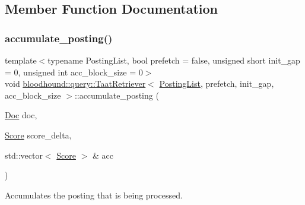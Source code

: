 \subsection{Member Function Documentation}
\mbox{\label{classbloodhound_1_1query_1_1TaatRetriever_a34def8d627b446d7459792ab9c50dcab}} 
\subsubsection{\texorpdfstring{accumulate\+\_\+posting()}{accumulate\_posting()}}
{\footnotesize\ttfamily template$<$typename Posting\+List, bool prefetch = false, unsigned short init\+\_\+gap = 0, unsigned int acc\+\_\+block\+\_\+size = 0$>$ \\
void \hyperlink{classbloodhound_1_1query_1_1TaatRetriever}{bloodhound\+::query\+::\+Taat\+Retriever}$<$ \hyperlink{classbloodhound_1_1PostingList}{Posting\+List}, prefetch, init\+\_\+gap, acc\+\_\+block\+\_\+size $>$\+::accumulate\+\_\+posting (\begin{DoxyParamCaption}\item[{\hyperlink{structbloodhound_1_1Doc}{Doc}}]{doc,  }\item[{\hyperlink{structbloodhound_1_1Score}{Score}}]{score\+\_\+delta,  }\item[{std\+::vector$<$ \hyperlink{structbloodhound_1_1Score}{Score} $>$ \&}]{acc }\end{DoxyParamCaption})\hspace{0.3cm}{\ttfamily [inline]}}



Accumulates the posting that is being processed. 

\mbox{\label{classbloodhound_1_1query_1_1TaatRetriever_a7f631f87075249c768873d15a59956c5}} 
